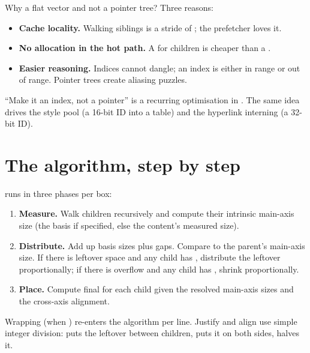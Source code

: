 Why a flat vector and not a pointer tree? Three reasons:

\begin{itemize}[leftmargin=*]
  \item \textbf{Cache locality.} Walking siblings is a stride of
    ; the prefetcher loves it.
  \item \textbf{No allocation in the hot path.} A
     for children is cheaper than a .
  \item \textbf{Easier reasoning.} Indices cannot dangle; an index
    is either in range or out of range. Pointer trees create
    aliasing puzzles.
\end{itemize}

\begin{idea}
``Make it an index, not a pointer'' is a recurring optimisation in
\maya{}. The same idea drives the style pool (a 16-bit ID into a
table) and the hyperlink interning (a 32-bit ID).
\end{idea}

\section{The algorithm, step by step}

 runs in three
phases per box:

\begin{enumerate}[leftmargin=*]
  \item \textbf{Measure.} Walk children recursively and compute their
    intrinsic main-axis size (the basis if specified, else the
    content's measured size).
  \item \textbf{Distribute.} Add up basis sizes plus gaps. Compare
    to the parent's main-axis size. If there is leftover space and
    any child has , distribute the leftover
    proportionally; if there is overflow and any child has
    , shrink proportionally.
  \item \textbf{Place.} Compute final  for each
    child given the resolved main-axis sizes and the cross-axis
    alignment.
\end{enumerate}

Wrapping (when ) re-enters the algorithm per line.
Justify and align use simple integer division: 
puts the leftover between children,  puts it on
both sides,  halves it.

